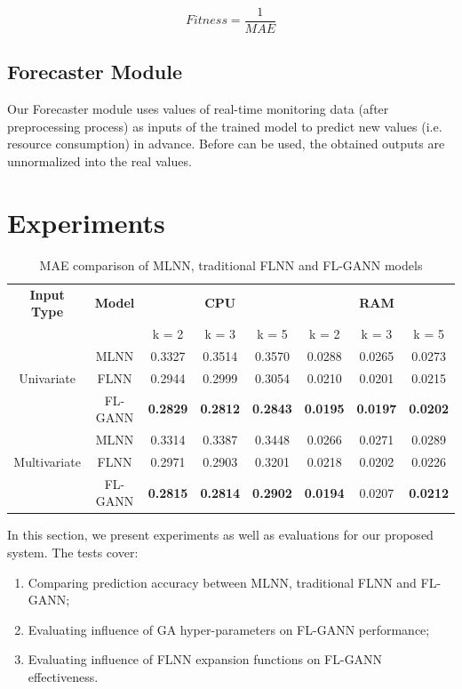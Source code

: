 \documentclass[conference]{IEEEtran}
\begin{document}
\begin{equation} 
Fitness = \frac{1}{MAE}	\label{eq_fitness}
\end{equation}

\subsection{Forecaster Module}
\label{forecater}
Our Forecaster module uses values of real-time monitoring data (after preprocessing process) as inputs of the trained model to predict new values (i.e. resource consumption) in advance. Before can be used, the obtained outputs are unnormalized into the real values.

\section{Experiments}
\label{experiments}

\begin{table}[h]
	\caption{MAE comparison of MLNN, traditional FLNN and FL-GANN models}
	\begin{center}
		\begin{tabular}{| c | c| c | c | c | c | c | c |}
			\hline
			\textbf{Input Type} & \textbf{Model} & \multicolumn{3}{c}{\textbf{CPU}}  & \multicolumn{3}{|c|}{\textbf{RAM}}  \\ \cline{3-8} 
			& & k = 2 & k = 3 & k = 5 & k = 2 & k = 3 & k = 5  \\ [0.5ex] \hline
			& MLNN & 0.3327	& 0.3514 & 0.3570	& 0.0288	& 0.0265 	& 0.0273  \\ 
			Univariate & FLNN	& 0.2944 	& 0.2999  & 0.3054	& 0.0210 	& 0.0201 	& 0.0215  \\
			& FL-GANN	& \textbf{0.2829}	& \textbf{0.2812} & \textbf{0.2843}	& \textbf{0.0195} 	& \textbf{0.0197}	& \textbf{0.0202}  \\ \hline
			
			& MLNN	& 0.3314	& 0.3387 	& 0.3448	& 0.0266 & 0.0271	& 0.0289 \\ 
			Multivariate & FLNN	& 0.2971 	& 0.2903 	& 0.3201	 & 0.0218  & 0.0202	& 0.0226   \\ 
			& FL-GANN	& \textbf{0.2815}	& \textbf{0.2814} 	& \textbf{0.2902}	& \textbf{0.0194} & 0.0207	& \textbf{0.0212}   \\ \hline 
		\end{tabular}
		\label{table:forecasting_results_MLNN_FLNN_FLGANN}
	\end{center}
\end{table}
In this section, we present experiments as well as evaluations for our proposed system. The tests cover: 
\begin{enumerate}
	\item Comparing prediction accuracy between MLNN, traditional FLNN and FL-GANN;
	\item Evaluating influence of GA hyper-parameters on FL-GANN performance;
	\item Evaluating influence of FLNN expansion functions on FL-GANN effectiveness. 
\end{enumerate}
\end{document}
